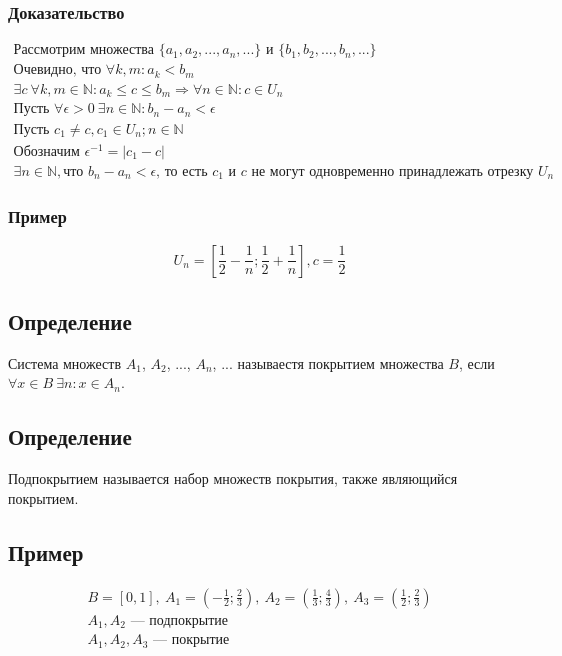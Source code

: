 \documentclass{article}
\begin{document}
\subsubsection{Доказательство}
\begin{gather*}
    \text{Рассмотрим множества } \{a_1, a_2, ..., a_n, ...\} \text{ и } \{b_1, b_2, ..., b_n, ...\} \\
    \text{Очевидно, что } \forall k, m: a_k < b_m \\
    \exists c ~ \forall k, m \in \mathbb{N}: a_k \le c \le b_m \Rightarrow \forall n \in \mathbb{N}: c \in U_n \\
    \text{Пусть } \forall \epsilon > 0 ~ \exists n \in \mathbb{N}: b_n - a_n < \epsilon \\
    \text{Пусть } c_1 \neq c, c_1 \in U_n; n \in \mathbb{N} \\
    \text{Обозначим } \epsilon^{-1} = |c_1 - c| \\
    \exists n \in \mathbb{N}, \text{что } b_n - a_n < \epsilon \text{, то есть } c_1 \text{ и } c \text{ не могут одновременно принадлежать отрезку } U_n
\end{gather*}

\subsubsection{Пример}
\[
U_n = \left[\frac{1}{2} - \frac{1}{n} ; \frac{1}{2} + \frac{1}{n}\right], c = \frac{1}{2}
\]


\subsection{Определение}
Система множеств $A_1$, $A_2$, ..., $A_n$, ... называестя покрытием множества $B$, если $\forall x \in B ~ \exists n: x \in A_n$.


\subsection{Определение}
Подпокрытием называется набор множеств покрытия, также являющийся покрытием.


\subsection{Пример}
\begin{gather*}
    B = \left[0, 1\right],~A_1 = \left(-\frac{1}{2} ; \frac{2}{3}\right),~A_2 = \left(\frac{1}{3} ; \frac{4}{3}\right),~A_3 = \left(\frac{1}{2} ; \frac{2}{3}\right) \\
    A_1, A_2 \text{ --- подпокрытие} \\
    A_1, A_2, A_3 \text{ --- покрытие}
\end{gather*}
\end{document}
